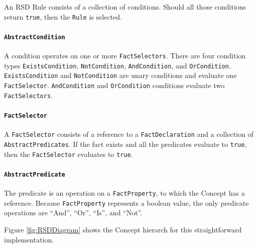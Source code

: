 An RSD Rule consists of a collection of conditions.
Should all those conditions return \texttt{true}, then the \texttt{Rule} is selected.

\paragraph{\texttt{AbstractCondition}} A condition operates on one or more \texttt{FactSelectors}.
There are four condition types \texttt{ExistsCondition}, \texttt{NotCondition}, \texttt{AndCondition}, and \texttt{OrCondition}.
\texttt{ExistsCondition} and \texttt{NotCondition} are unary conditions and evaluate one \texttt{FactSelector}.
\texttt{AndCondition} and \texttt{OrCondition} conditions evaluate two \texttt{FactSelectors}.

\paragraph{\texttt{FactSelector}} A \texttt{FactSelector} consists of a reference to a \texttt{FactDeclaration} and a collection of \texttt{AbstractPredicates}.
If the fact exists and all the predicates evaluate to \texttt{true}, then the \texttt{FactSelector} evaluates to \texttt{true}.

\paragraph{\texttt{AbstractPredicate}} The predicate is an operation on a \texttt{FactProperty}, to which the Concept has a reference.
Because \texttt{FactProperty} represents a boolean value, the only predicate operations are ``And'', ``Or'', ``Is'', and ``Not''.

Figure \ref{fig:RSDDiagram} shows the Concept hierarch for this straightforward implementation.

